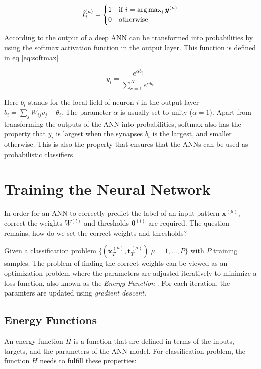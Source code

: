 \begin{equation}
    \label{eq:assign1hot}
    \hat{t}_i^{(\mu)} = \begin{cases}
        1 & \text{if }i = \operatorname*{arg\,max}_i \bm{y}^{(\mu)} \\
        0 & \text{otherwise}
    \end{cases}
\end{equation}

According to \cite{mehligcourseslides} the output of a deep ANN can be transformed into probabilities by using the softmax activation function in the output layer. This function is defined in eq \eqref{eq:softmax}

\begin{equation}
    \label{eq:softmax}
    y_i = \frac{e^{\alpha b_i}}{\sum_{c = 1}^N e^{\alpha b_c}}
\end{equation}

Here $b_i$ stands for the local field of neuron $i$ in the output layer $b_i = \sum_j W_{ij}v_j - \theta_i$. The parameter $\alpha$ is usually set to unity ($\alpha = 1$). Apart from transforming the outputs of the ANN into probabilities, softmax also has the property that $y_i$ is largest when the synapses $b_i$ is the largest, and smaller otherwise. This is also the property that ensures that the ANNs can be used as probabilistic classifiers.

\section{Training the Neural Network}
\label{sect:train}

In order for an ANN to correctly predict the label of an input pattern $\bm{x}^{(\mu)}$, correct the weights $W^{(l)}$ and thresholds $\bm{\theta}^{(l)}$ are required. The question remains, how do we set the correct weights and thresholds?

Given a classification problem $\{(\bm{x}_T^{(\mu)},\bm{t}_T^{(\mu)})| \mu = 1,...,P\}$ with $P$ training samples. The problem of finding the correct weights can be viewed as an optimization problem where the parameters are adjusted iteratively to minimize a loss function, also known as the \textit{Energy Function} \cite{mehligcourseslides,Goodfellow-et-al-2016}. For each iteration, the paramters are updated using \textit{gradient descent}.

\subsection{Energy Functions}
\label{sect:energyfunc}
An energy function $H$ is a function that are defined in terms of the inputs, targets, and the parameters of the ANN model. For classification problem, the function $H$ needs to fulfill these properties:

